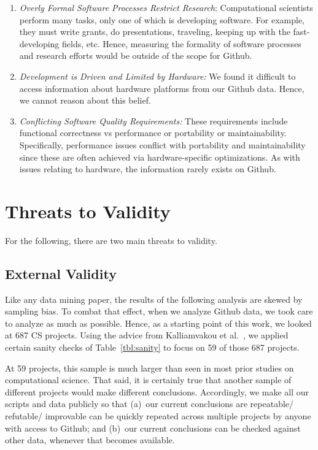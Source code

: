 \documentclass[sigconf,review,anonymous]{acmart}
\newcommand{\be}{\begin{enumerate}}
\newcommand{\ee}{\end{enumerate}}
\begin{document}
\be
\item {\em Overly Formal Software Processes Restrict Research}: Computational scientists perform many tasks,
only one of which is developing software. For example,
they must write grants, do presentations, traveling, keeping up with the fast-developing fields, etc. Hence, measuring the formality of software processes and research efforts would be outside of the scope for Github.
\item {\em Development is Driven and Limited by Hardware:}
We found it difficult to access information about hardware platforms from our Github data. Hence, we cannot reason about this belief.
\item {\em Conflicting Software Quality Requirements:} These requirements include functional correctness vs
performance or portability or maintainability. Specifically, performance issues conflict with portability and maintainability since these are often achieved via hardware-specific optimizations. As with issues
relating to hardware,
the information rarely exists on Github. 
\ee

\section{Threats to Validity}

For the following, there are two main threats to validity.

\subsection{External Validity}
Like any data mining paper,
the results of the following analysis are skewed by sampling bias.
To combat that effect, when we analyze Github data, we took care to analyze as much as possible.
Hence,
as a starting point of this work, we looked at 687 CS projects. 
Using the advice from Kalliamvakou et al.~\cite{Kalliamvakou:2014}, we applied certain sanity checks of Table~\ref{tbl:sanity}  to focus on 59 of those 687 projects.

At 59 projects, this sample is much larger than seen in
most prior studies on computational
science. That said, it is certainly true that another sample of different projects would make different conclusions.
Accordingly, we make all our scripts and data publicly so that
(a)~our current conclusions
are repeatable/ refutable/ improvable can be quickly repeated across multiple projects by anyone with access to Github; and (b)~our current conclusions can be checked against other data, whenever that becomes available.
\end{document}
